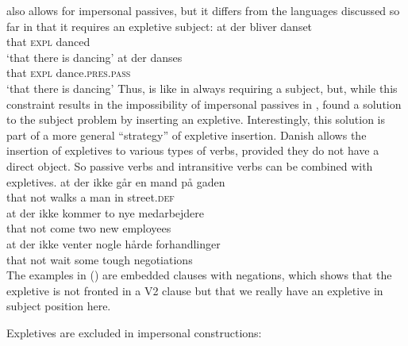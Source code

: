 \noindent
{} also allows for impersonal passives, but it differs from the languages discussed so far in
that it requires an expletive subject:
\eal
\ex\label{ex-at-der-bliver-danset} 
\gll at der bliver danset\\
     that \textsc{expl} \AUX{} danced\\\danish
\glt `that there is dancing'
\ex
\gll at der danses\\
     that \textsc{expl} dance.\textsc{pres}.\textsc{pass}\\
\glt `that there is dancing'
\zl
Thus,  is like  in always requiring a subject, but, while this constraint results in the
impossibility of impersonal passives in ,  found a solution to the subject problem by
inserting an expletive. Interestingly, this solution is part of a more general ``strategy'' of
expletive insertion. Danish allows the insertion of expletives to various types of verbs, provided
they do not have a direct object. So passive verbs and intransitive verbs can be combined with
expletives.
\eal
\ex 
\gll at    der    ikke går   en mand på gaden\\
     that \expl{} not  walks a  man  in street.\textsc{def}\\\danish
\ex 
\gll at   der     ikke kommer to  nye medarbejdere\\
     that \expl{} not  come   two new employees\\
\ex
\gll at   der     ikke venter nogle hårde forhandlinger\\
     that \expl{} not  wait   some  tough negotiations\\
\zl
The examples in () are embedded clauses with negations, which shows that the expletive is not
fronted in a V2 clause but that we really have an expletive in subject position here.


Expletives are excluded in  impersonal constructions:
\nocite{MOe2011a}
\z
{}


